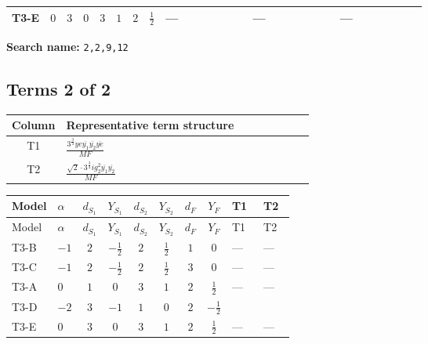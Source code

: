 \documentclass[8pt]{article}
\begin{document}
\begin{landscape}
\begin{longtable}{@{}llcccccc >{\raggedright\arraybackslash}p{0.21\linewidth} >{\raggedright\arraybackslash}p{0.21\linewidth} >{\raggedright\arraybackslash}p{0.21\linewidth}@{}}
\midrule
T3-E & $0$ & $3$ & $0$ & $3$ & $1$ & $2$ & $\frac{1}{2}$ & --- & --- & --- \\
\midrule
\bottomrule
\end{longtable}
\clearpage
\noindent\textbf{Search name: }\texttt{2,2,9,12}\par\smallskip
\subsection*{Terms 2 of 2}
\begin{center}
\begin{tabular}{@{}c >{\raggedright\arraybackslash}p{0.82\linewidth}@{}}
\toprule
Column & Representative term structure \\
\midrule
T1 & \(\displaystyle \frac{3^{\frac{3}{4}} ye \overline{y_{1}} \overline{y_{2}} \overline{ye}}{MF}\) \\
\midrule
T2 & \(\displaystyle \frac{\sqrt{2} \cdot 3^{\frac{3}{4}} i g_{2}^{2} \overline{y_{1}} \overline{y_{2}}}{MF}\) \\
\midrule
\bottomrule
\end{tabular}
\end{center}
\smallskip
\tiny
\begin{longtable}{@{}llcccccc >{\raggedright\arraybackslash}p{0.21\linewidth} >{\raggedright\arraybackslash}p{0.21\linewidth}@{}}
\toprule
Model & $\alpha$ & $d_{S_1}$ & $Y_{S_1}$ & $d_{S_2}$ & $Y_{S_2}$ & $d_F$ & $Y_F$ & T1 & T2 \\
\midrule
\endfirsthead
\toprule
Model & $\alpha$ & $d_{S_1}$ & $Y_{S_1}$ & $d_{S_2}$ & $Y_{S_2}$ & $d_F$ & $Y_F$ & T1 & T2 \\
\midrule
\endhead
T3-B & $-1$ & $2$ & $-\frac{1}{2}$ & $2$ & $\frac{1}{2}$ & $1$ & $0$ & --- & --- \\
\midrule
T3-C & $-1$ & $2$ & $-\frac{1}{2}$ & $2$ & $\frac{1}{2}$ & $3$ & $0$ & --- & --- \\
\midrule
T3-A & $0$ & $1$ & $0$ & $3$ & $1$ & $2$ & $\frac{1}{2}$ & --- & --- \\
\midrule
T3-D & $-2$ & $3$ & $-1$ & $1$ & $0$ & $2$ & $-\frac{1}{2}$ & \scriptsize\adjustbox{max width=\linewidth}{$\begin{gathered} - \frac{3^{\frac{3}{4}} ye \overline{y_{1}} \overline{y_{2}} \overline{ye}}{12 MF}\end{gathered}$} & \scriptsize\adjustbox{max width=\linewidth}{$\begin{gathered} - \frac{\sqrt{2} \cdot 3^{\frac{3}{4}} i g_{2}^{2} \overline{y_{1}} \overline{y_{2}}}{3 MF}\end{gathered}$} \\
\midrule
T3-E & $0$ & $3$ & $0$ & $3$ & $1$ & $2$ & $\frac{1}{2}$ & --- & --- \\
\midrule
\bottomrule
\end{longtable}
\clearpage

\end{landscape}
\end{document}
